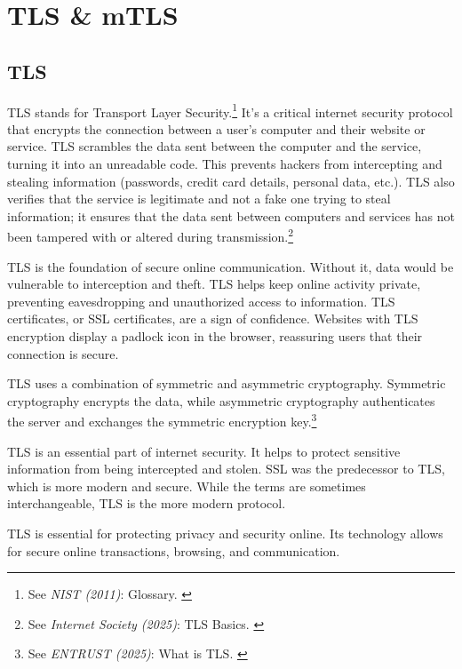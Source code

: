 %
%

\pagebreak
\section{TLS \& mTLS}

\onehalfspacing

\subsection{TLS}

TLS stands for Transport Layer Security.\footnote{See \textit{NIST (2011)}: Glossary. \cite{nistTLS}} It's a critical internet
security protocol that encrypts the connection between a user's computer
and their website or service. TLS scrambles the data sent between the
computer and the service, turning it into an unreadable code. This
prevents hackers from intercepting and stealing information (passwords,
credit card details, personal data, etc.). TLS also verifies that the
service is legitimate and not a fake one trying to steal information; it
ensures that the data sent between computers and services has not been
tampered with or altered during transmission.\footnote{See \textit{Internet Society (2025)}: TLS Basics. \cite{tlsBasics}}

TLS is the foundation of secure online communication. Without it, data
would be vulnerable to interception and theft. TLS helps keep online
activity private, preventing eavesdropping and unauthorized access to
information. TLS certificates, or SSL certificates, are a sign of
confidence. Websites with TLS encryption display a padlock icon in the
browser, reassuring users that their connection is secure.

TLS uses a combination of symmetric and asymmetric
cryptography. Symmetric cryptography encrypts the data, while
asymmetric cryptography authenticates the server and exchanges the
symmetric encryption key.\footnote{See \textit{ENTRUST (2025)}: What is TLS. \cite{whatIsTls}}

TLS is an essential part of internet security. It helps to
protect sensitive information from being intercepted and stolen. SSL was
the predecessor to TLS, which is more modern and secure. While the terms
are sometimes interchangeable, TLS is the more modern protocol.

TLS is essential for protecting privacy and security online. Its
technology allows for secure online transactions, browsing, and
communication.

